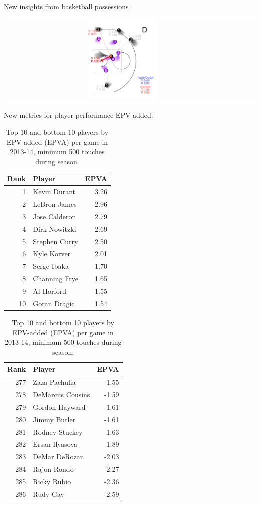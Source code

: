 \documentclass[10pt]{beamer}
\begin{document}
\begin{frame}{New insights from basketball possessions}
\begin{tabular}{ccc}
\includegraphics[width=0.3\textwidth]{graphics/micro_4_2} 
\end{tabular}
\end{frame}

\begin{frame}{New metrics for player performance}
EPV-added:
\begin{table}[ht]
\centering
\begin{tabular}{rlr}
  \toprule
Rank &  Player & EPVA \\
   \midrule
1 & Kevin Durant & 3.26 \\
2 & LeBron James & 2.96 \\
3 & Jose Calderon & 2.79 \\
4 & Dirk Nowitzki & 2.69 \\
5 & Stephen Curry & 2.50 \\
6 & Kyle Korver & 2.01 \\
7 & Serge Ibaka & 1.70 \\
8 & Channing Frye & 1.65 \\
9 & Al Horford & 1.55 \\
10 & Goran Dragic & 1.54 \\
\bottomrule
\end{tabular}
\quad
\begin{tabular}{rlr}
  \toprule
Rank & Player & EPVA \\ 
  \midrule
277 & Zaza Pachulia & -1.55 \\
278 & DeMarcus Cousins & -1.59 \\
279 & Gordon Hayward & -1.61 \\
280 & Jimmy Butler & -1.61 \\
281 & Rodney Stuckey & -1.63 \\
282 & Ersan Ilyasova & -1.89 \\
283 & DeMar DeRozan & -2.03 \\
284 & Rajon Rondo & -2.27 \\
285 & Ricky Rubio & -2.36 \\
286 & Rudy Gay & -2.59 \\
\bottomrule
\end{tabular}
\caption[]{Top 10 and bottom 10 players by EPV-added (EPVA) per game in 2013-14, minimum 500 touches during season.}
\end{table}
\end{frame}
\end{document}
